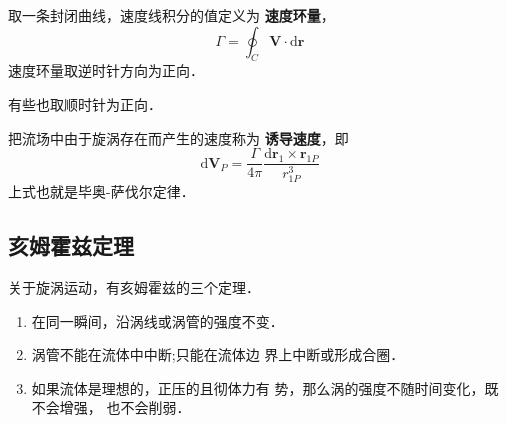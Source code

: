 取一条封闭曲线，速度线积分的值定义为{\bfseries
速度环量}，
\[
  \Gamma=\oint_C \mathbf{V}\cdot \mathrm{d}\mathbf{r}
\]
速度环量取逆时针方向为正向．
\begin{note}
有些也取顺时针为正向．
\end{note}

把流场中由于旋涡存在而产生的速度称为{\bfseries
诱导速度}，即
\[
  \mathrm{d}\mathbf{V}_P=
  \frac{\Gamma}{4\pi}
  \frac{\mathrm{d}\mathbf{r}_1\times \mathbf{r}_{1P}}
  {r^3_{1P}}
\]
上式也就是毕奥-萨伐尔定律．

\subsection{亥姆霍兹定理}
关于旋涡运动，有亥姆霍兹的三个定理．
\begin{enumerate}
  \item 在同一瞬间，沿涡线或涡管的强度不变．
  \item 涡管不能在流体中中断;只能在流体边
    界上中断或形成合圈．
  \item 如果流体是理想的，正压的且彻体力有
    势，那么涡的强度不随时间变化，既不会增强，
    也不会削弱． 
\end{enumerate}

